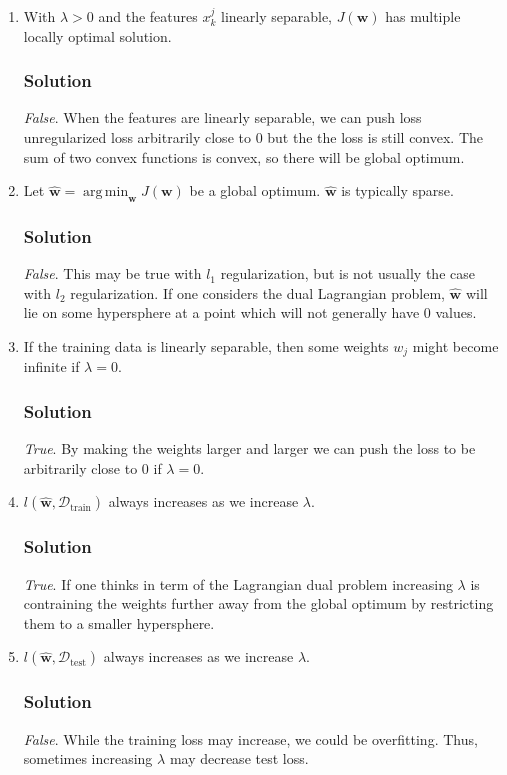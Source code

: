 \documentclass[letterpaper,11pt]{article}
\DeclareMathOperator*{\argmin}{arg\,min}
\begin{document}
\begin{enumerate}
\item With $\lambda > 0$ and the features $x^j_k$ linearly separable,
  $J\left(\mathbf{w}\right)$ has multiple locally optimal solution.
  \subsubsection*{Solution}
  
  \emph{False}. When the features are linearly separable, we can push loss
  unregularized loss arbitrarily close to $0$ but the the loss is
  still convex. The sum of two convex functions is convex, so there
  will be global optimum.
  
\item Let
  $\hat{\mathbf{w}} = \argmin_{\mathbf{w}} J\left(\mathbf{w}\right)$ be
    a global optimum. $\hat{\mathbf{w}}$ is typically sparse.
    
    \subsubsection*{Solution}
    \emph{False}. This may be true with $l_1$ regularization, but is not
    usually the case with $l_2$ regularization. If one considers the
    dual Lagrangian problem, $\hat{\mathbf{w}}$ will lie on some
    hypersphere at a point which will not generally have $0$ values.
  \item If the training data is linearly separable, then some weights
    $w_j$ might become infinite if $\lambda = 0$.
    \subsubsection*{Solution}

    \emph{True}. By making the weights larger and larger we can push the loss
    to be arbitrarily close to $0$ if $\lambda = 0.$
    
  \item $l\left(\hat{\mathbf{w}}, \mathcal{D}_\mathrm{train}\right)$
    always increases as we increase $\lambda$.
    \subsubsection*{Solution}

    \emph{True}. If one thinks in term of the Lagrangian dual problem
    increasing $\lambda$ is contraining the weights further away from
    the global optimum by restricting them to a smaller hypersphere.

  \item $l\left(\hat{\mathbf{w}}, \mathcal{D}_\mathrm{test}\right)$
    always increases as we increase $\lambda$.
    \subsubsection*{Solution}

    \emph{False}. While the training loss may increase, we could be
    overfitting. Thus, sometimes increasing $\lambda$ may decrease
    test loss.    
\end{enumerate}
\end{document}
